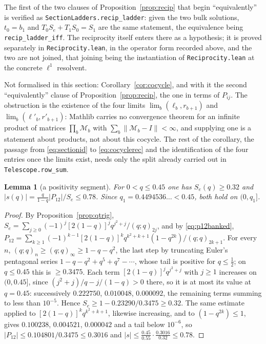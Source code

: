 \documentclass[11pt]{article}
\theoremstyle{plain}
\newtheorem{lemma}[theorem]{Lemma}
\theoremstyle{definition}
\theoremstyle{remark}
\begin{document}
The first of the two clauses of Proposition~\ref{prop:recip} that begin ``equivalently'' is
verified as \texttt{SectionLadders.recip\_ladder}: given the two bulk solutions, $t_0=b_1$ and
$T_0S_e+T_1S_0=S_1$ are the same statement, the equivalence being
\texttt{recip\_ladder\_iff}. The reciprocity itself enters there as a hypothesis; it is proved
separately in \texttt{Reciprocity.lean}, in the operator form recorded above, and the two are not
joined, that joining being the instantiation of \texttt{Reciprocity.lean} at the concrete
$\ell^1$ resolvent.

Not formalised in this section: Corollary~\ref{cor:cocycle}, and with it the second
``equivalently'' clause of Proposition~\ref{prop:recip}, the one in terms of $P_{ij}$. The
obstruction is the existence of the four limits $\lim_b(\ell_b,r_{b+1})$ and
$\lim_b(\ell'_b,r'_{b+1})$: Mathlib carries no convergence theorem for an infinite product of
matrices $\prod_b\mathcal M_b$ with $\sum_b\|\mathcal M_b-I\|<\infty$, and supplying one is a
statement about products, not about this cocycle. The rest of the corollary, the passage from
\eqref{eq:sectionid} to \eqref{eq:cocyclerec} and the identification of the four entries once the
limits exist, needs only the split already carried out in \texttt{Telescope.row\_sum}.

\begin{lemma}[a positivity segment]\label{lem:posseg}
For $0<q\le0.45$ one has $S_e(q)\ge0.32$ and $|s(q)|=\tfrac{q}{1-q}|P_{12}|/S_e\le0.78$. Since
$q_1=0.4494536\ldots<0.45$, both hold on $(0,q_1]$.
\end{lemma}

\begin{proof}
By Proposition~\ref{prop:qtrig}, $S_e=\sum_{j\ge0}(-1)^j[2(1-q)]^jq^{j^2+j}/(q;q)_{2j}$, and by
\eqref{eq:p12banked},
$P_{12}=\sum_{k\ge1}(-1)^{k-1}[2(1-q)]^kq^{k^2+k+1}(1-q^{2k})/(q;q)_{2k+1}$. For every $n$,
$(q;q)_n\ge(q;q)_\infty\ge1-q-q^2$, the last step by truncating Euler's pentagonal series
$1-q-q^2+q^5+q^7-\cdots$, whose tail is positive for $q\le\tfrac12$; on $q\le0.45$ this is
$\ge0.3475$. Each term $[2(1-q)]^jq^{j^2+j}$ with $j\ge1$ increases on $(0,0.45]$, since
$(j^2+j)/q-j/(1-q)>0$ there, so it is at most its value at $q=0.45$: successively
$0.222750$, $0.010048$, $0.000092$, the remaining terms summing to less than $10^{-5}$. Hence
$S_e\ge1-0.23290/0.3475\ge0.32$. The same estimate applied to $[2(1-q)]^kq^{k^2+k+1}$, likewise
increasing, and to $(1-q^{2k})\le1$, gives $0.100238$, $0.004521$, $0.000042$ and a tail below
$10^{-6}$, so $|P_{12}|\le0.104801/0.3475\le0.3016$ and
$|s|\le\tfrac{0.45}{0.55}\cdot\tfrac{0.3016}{0.32}\le0.78$.
\end{proof}
\end{document}
